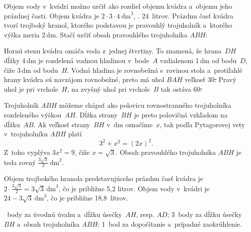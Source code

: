 {%
Objem vody v~kvádri možno určiť ako rozdiel objemu kvádra a~objemu jeho prázdnej časti.
Objem kvádra je $2\cdot3\cdot4\ \text{dm}^3$, \tj. 24~litrov.
Prázdnu časť kvádra tvorí trojboký hranol, ktorého podstavou je pravouhlý trojuholník a~ktorého výška meria 2\,dm.
Stačí určiť obsah pravouhlého trojuholníka $ABH$:
%

Hornú stenu kvádra omáča voda z~jednej štvrtiny.
To znamená, že hrana~$DH$ dĺžky 4\,dm je rozdelená vodnou hladinou v~bode~$A$ vzdialenom 1\,dm od bodu~$D$, čiže 3\,dm od bodu~$H$.
Vodná hladina je rovnobežná s~rovinou stola a~protiľahlé hrany kvádra sú navzájom rovnobežné, preto má uhol $BAH$ veľkosť 30\st.
Pravý uhol je pri vrchole~$H$, na zvyšný uhol pri vrchole~$B$ tak ostáva 60\st.

Trojuholník $ABH$ môžeme chápať ako polovicu rovnostranného trojuholníka rozdeleného výškou~$AH$.
Dĺžka strany~$BH$ je preto polovičná vzhľadom na dĺžku~$AB$.
Ak veľkosť strany~$BH$ v~dm označíme~$x$, tak podľa Pytagorovej vety v~trojuholníku $ABH$ platí
$$
3^2+x^2=(2x)^2.
$$
Z~toho vyplýva $3x^2=9$, čiže $x=\sqrt3$.
Obsah pravouhlého trojuholníka $ABH$ je teda rovný $\frac{3\sqrt3}2\,\text{dm}^2$.

Objem trojbokého hranola predstavujúceho prázdnu časť kvádra je $2\cdot\frac{3\sqrt3}2=3\sqrt3\,\text{dm}^3$, čo je približne 5,2 litrov.
Objem vody v~kvádri je $24-3\sqrt3\ \text{dm}^3$, čo je približne 18,8~litrov.

~body za úvodnú úvahu a~dĺžku úsečky~$AH$, resp. $AD$;
3~body za dĺžku úsečky~$BH$ a~obsah trojuholníka $ABH$;
1~bod za dopočítanie a~prípadné zaokrúhlenie.
\endhodnotenie
}

